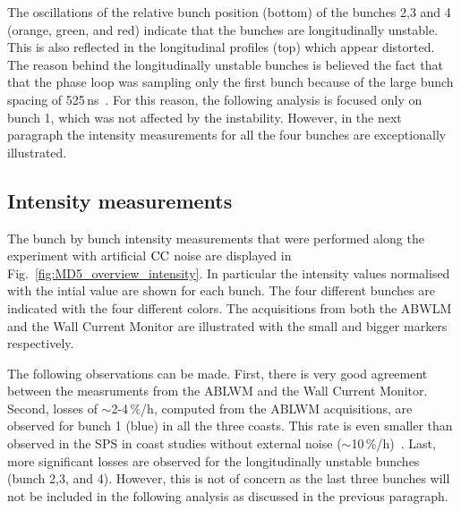 
The oscillations of the relative bunch position (bottom) of the bunches 2,3 and 4 (orange, green, and red) indicate that the bunches are longitudinally unstable. This is also reflected in the longitudinal profiles (top) which appear distorted. The reason behind the longitudinally unstable bunches is believed the fact that that the phase loop was sampling only the first bunch
because of the large bunch spacing of 525\,ns~\cite{Argyropoulos_unstable_bunches_2018}. For this reason, the following analysis is focused only on bunch 1, which was not affected by the instability. However, in the next paragraph the intensity measurements for all the four bunches are exceptionally illustrated.

\subsection{Intensity measurements}\label{subsec:intensity_2018_meas}
The bunch by bunch intensity measurements that were performed along the experiment with artificial ${\mathrm{CC}}$ noise are displayed in Fig.~\ref{fig:MD5_overview_intensity}. In particular the intensity values normalised with the intial value are shown for each bunch. The four different bunches are indicated with the four different colors. The acquisitions from both the ABWLM and the Wall Current Monitor are illustrated with the small and bigger markers respectively.

The following observations can be made. First, there is very good agreement between the measruments from the ABLWM and the Wall Current Monitor. Second, losses of $\sim$2-4\,$\%$/h, computed from the ABLWM acquisitions, are observed for bunch 1 (blue) in all the three coasts. This rate is even smaller than observed in the SPS in coast studies without external noise ($\sim$10\,$\%$/h)~\cite{Alekou_CC_coast_prep_2016}. Last, more significant losses are observed for the longitudinally unstable bunches (bunch 2,3, and 4). However, this is not of concern as the last three bunches will not be included in the following analysis as discussed in the previous paragraph.

